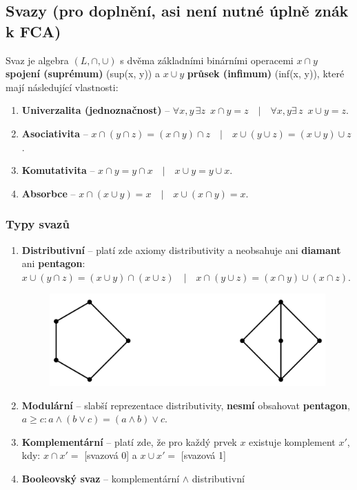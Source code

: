 \subsection{Svazy (pro doplnění, asi není nutné úplně znák k FCA)}
Svaz je algebra $(L, \cap, \cup)$ s dvěma základními binárními operacemi $x\cap{}y$ \textbf{spojení (suprémum)} (sup(x, y)) a $x\cup{}y$ \textbf{průsek (infimum)} (inf(x, y)), které mají následující vlastnosti:
\begin{enumerate}
\item \textbf{Univerzalita (jednoznačnost)} -- $\forall x,y \,\exists z \,\,\, x \cap y = z\quad|\quad\forall x,y \exists\, z \,\,\, x \cup y = z$.
\item \textbf{Asociativita} -- $x \cap (y \cap z) = (x \cap y) \cap z \quad|\quad x \cup (y \cup z) = (x \cup y) \cup z$.
\item \textbf{Komutativita} -- $x \cap y = y \cap x \quad|\quad x \cup y = y \cup x$.
\item \textbf{Absorbce} -- $x \cap (x \cup y) = x \quad|\quad x \cup (x \cap y) = x $.
\end{enumerate}

\subsubsection{Typy svazů}
\begin{enumerate}
\item \textbf{Distributivní} -- platí zde axiomy distributivity a neobsahuje ani \textbf{diamant} ani \textbf{pentagon}: $x \cup (y \cap z) = (x \cup y) \cap (x \cup z) \quad|\quad x \cap (y \cup z) = (x \cap y) \cup (x \cap z) $.

\begin{figure}[H]
	\centering
	\includegraphics[width=.4\textwidth]{assets/pentagon_diamant}
\end{figure}
\item \textbf{Modulární} -- slabší reprezentace distributivity, \textbf{nesmí} obsahovat \textbf{pentagon}, $a \geq c: a \land (b \lor c) = (a \land b) \lor c$.
\item \textbf{Komplementární} -- platí zde, že pro každý prvek $ x $ existuje komplement $x' $, kdy: $x \cap x' = $ [svazová 0] a $x \cup x' = $ [svazová 1]
\item \textbf{Booleovský svaz} -- komplementární $\land$ distributivní
\end{enumerate}


